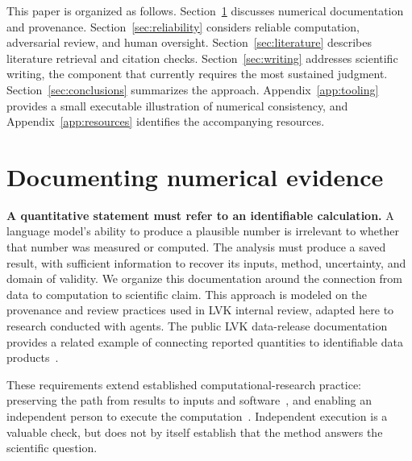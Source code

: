 \documentclass[aps,prd,reprint,nofootinbib]{revtex4-2}
\begin{document}
This paper is organized as follows. Section~\ref{sec:documentation} discusses numerical documentation and provenance. Section~\ref{sec:reliability} considers reliable computation, adversarial review, and human oversight. Section~\ref{sec:literature} describes literature retrieval and citation checks. Section~\ref{sec:writing} addresses scientific writing, the component that currently requires the most sustained judgment. Section~\ref{sec:conclusions} summarizes the approach. Appendix~\ref{app:tooling} provides a small executable illustration of numerical consistency, and Appendix~\ref{app:resources} identifies the accompanying resources.

\section{Documenting numerical evidence}\label{sec:documentation}
\textbf{A quantitative statement must refer to an identifiable calculation.} A language model's ability to produce a plausible number is irrelevant to whether that number was measured or computed. The analysis must produce a saved result, with sufficient information to recover its inputs, method, uncertainty, and domain of validity. We organize this documentation around the connection from data to computation to scientific claim. This approach is modeled on the provenance and review practices used in LVK internal review, adapted here to research conducted with agents. The public LVK data-release documentation provides a related example of connecting reported quantities to identifiable data products~\cite{GWTCRelease}.

These requirements extend established computational-research practice: preserving the path from results to inputs and software~\cite{Sandve2013}, and enabling an independent person to execute the computation~\cite{CODECHECK}. Independent execution is a valuable check, but does not by itself establish that the method answers the scientific question.
\end{document}
